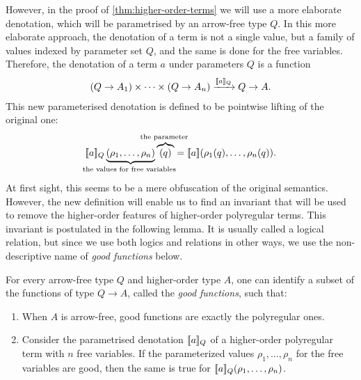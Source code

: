 However, in the proof of \cref{thm:higher-order-terms} we will use a more elaborate denotation, which will be parametrised by an arrow-free type $Q$. In this more elaborate approach, the denotation of a  term is not a single value, but a family of values indexed by parameter set $Q$, and the same is done for the free variables. Therefore, the denotation of a term $a$ under parameters $Q$ is a function 
\begin{align*}
(Q \to A_1)\times \cdots \times (Q \to A_n) \xrightarrow{[\![a]\!]_{Q}} {Q \to A}.
\end{align*}
This new parameterised denotation is  defined to be  pointwise lifting of the original one: 
\begin{align*}
\sem a_Q \myunderbrace{(\rho_1,\ldots,\rho_n)}{the values for free variables} \myoverbrace{(q)}{the parameter} = \sem{a}(\rho_1(q),\ldots,\rho_n(q)).
\end{align*}
At first sight, this  seems to be a mere obfuscation of the original semantics. However, the new definition  will enable us to find an invariant that will be used to remove the higher-order features of  higher-order polyregular terms.  This invariant is postulated in the following lemma. It is usually called a logical relation, but since we use both logics and relations in other ways, we use the non-descriptive name of \emph{good functions} below.

\begin{lemma} \label{lem:fundamental-lemma} For every arrow-free type $Q$ and higher-order type $A$, one can identify  a subset of the functions of type $Q \to A$, called the \emph{good functions}, such that:
\begin{enumerate}
    \item When $A$ is arrow-free, good functions  are exactly the polyregular ones.
    \item  Consider the parametrised denotation  $[\![a]\!]_Q$ of a higher-order polyregular term with $n$ free variables. If the parameterized values $\rho_1,\ldots,\rho_n$ for the free variables are good, then the same is true for $[\![a]\!]_Q (\rho_1,\ldots,\rho_n)$.
\end{enumerate}
\end{lemma}

